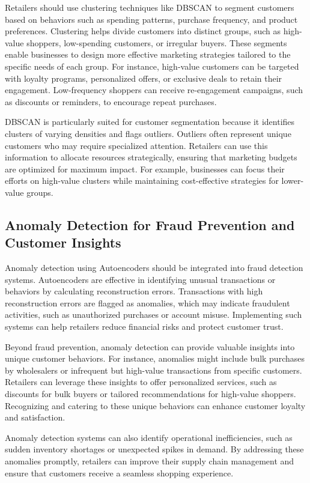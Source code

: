 \documentclass[12pt, a4paper,twoside]{report}
\theoremstyle{plain} %
\theoremstyle{definition} %
\theoremstyle{remark} %
\numberwithin{equation}{chapter}
\begin{document}
Retailers should use clustering techniques like DBSCAN to segment customers based on behaviors such as spending patterns, purchase frequency, and product preferences. Clustering helps divide customers into distinct groups, such as high-value shoppers, low-spending customers, or irregular buyers. These segments enable businesses to design more effective marketing strategies tailored to the specific needs of each group. For instance, high-value customers can be targeted with loyalty programs, personalized offers, or exclusive deals to retain their engagement. Low-frequency shoppers can receive re-engagement campaigns, such as discounts or reminders, to encourage repeat purchases.

DBSCAN is particularly suited for customer segmentation because it identifies clusters of varying densities and flags outliers. Outliers often represent unique customers who may require specialized attention. Retailers can use this information to allocate resources strategically, ensuring that marketing budgets are optimized for maximum impact. For example, businesses can focus their efforts on high-value clusters while maintaining cost-effective strategies for lower-value groups.

\subsection{Anomaly Detection for Fraud Prevention and Customer Insights}

Anomaly detection using Autoencoders should be integrated into fraud detection systems. Autoencoders are effective in identifying unusual transactions or behaviors by calculating reconstruction errors. Transactions with high reconstruction errors are flagged as anomalies, which may indicate fraudulent activities, such as unauthorized purchases or account misuse. Implementing such systems can help retailers reduce financial risks and protect customer trust.

Beyond fraud prevention, anomaly detection can provide valuable insights into unique customer behaviors. For instance, anomalies might include bulk purchases by wholesalers or infrequent but high-value transactions from specific customers. Retailers can leverage these insights to offer personalized services, such as discounts for bulk buyers or tailored recommendations for high-value shoppers. Recognizing and catering to these unique behaviors can enhance customer loyalty and satisfaction.

Anomaly detection systems can also identify operational inefficiencies, such as sudden inventory shortages or unexpected spikes in demand. By addressing these anomalies promptly, retailers can improve their supply chain management and ensure that customers receive a seamless shopping experience.
\end{document}
